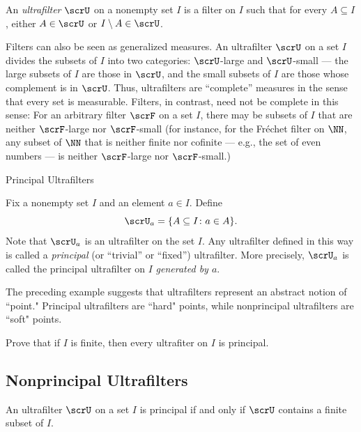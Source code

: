 \begin{definition}
  An \emph{ultrafilter} $\scrU$ on a nonempty set $I$ is a filter on $I$ such that for every $A\subseteq I$, either $A\in \scrU$ or $I\setminus A\in \scrU$.
\end{definition}

Filters can also be seen as generalized measures.
An ultrafilter $\scrU$ on a set $I$ divides the subsets of $I$ into two categories:
$\scrU$-large and $\scrU$-small --- the large subsets of $I$ are those in $\scrU$, and the small subsets of $I$ are those whose complement is in $\scrU$.
Thus, ultrafilters are “complete” measures in the sense that every set is measurable.
Filters, in contrast, need not be complete in this sense:
For an arbitrary filter $\scrF$ on a set $I$, there may be subsets of
$I$ that are neither $\scrF$-large nor $\scrF$-small (for instance, for the Fréchet filter on $\NN$, any subset of $\NN$ that is neither finite nor cofinite --- e.g., the set of even numbers --- is neither $\scrF$-large nor $\scrF$-small.)

\begin{example} Principal Ultrafilters

  Fix a nonempty set $I$ and an element $a\in I$.
  Define
  \[
    \scrU_a=\{A\subseteq I \colon a\in A\}.
  \]
  Note that $\scrU_a$ is an ultrafilter on the set $I$.
  Any ultrafilter defined in this way is called a \emph{principal} (or “trivial” or “fixed”) ultrafilter.
  More precisely, $\scrU_a$ is called the principal ultrafilter on $I$ \emph{generated by $a$}.
\end{example}

The preceding example suggests that ultrafilters represent an abstract notion of “point." Principal ultrafilters are “hard" points, while nonprincipal ultrafilters are “soft" points.

\begin{exercise}
  Prove that if $I$ is finite, then every ultrafiter on $I$ is principal.
\end{exercise}

\subsection{Nonprincipal Ultrafilters \nopunct}

\begin{proposition}
  An ultrafilter $\scrU$ on a set $I$ is principal if and only if $\scrU$ contains a finite subset of $I$.
\end{proposition}

